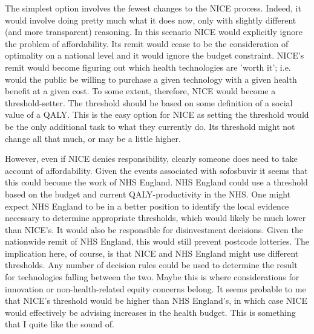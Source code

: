 The simplest option involves the fewest changes to the NICE process. Indeed, it would involve doing pretty much what it does now, only with slightly different (and more transparent) reasoning. In this scenario NICE would explicitly ignore the problem of affordability. Its remit would cease to be the consideration of optimality on a national level and it would ignore the budget constraint. NICE's remit would become figuring out which health technologies are 'worth it'; i.e. would the public be willing to purchase a given technology with a given health benefit at a given cost. To some extent, therefore, NICE would become a threshold-setter. The threshold should be based on some definition of a social value of a QALY. This is the easy option for NICE as setting the threshold would be the only additional task to what they currently do. Its threshold might not change all that much\cite{Donaldson_2011}, or may be a little higher\cite{Bobinac_2012}.

However, even if NICE denies responsibility, clearly someone does need to take account of affordability. Given the events associated with sofosbuvir it seems that this could become the work of NHS England. NHS England could use a threshold based on the budget and current QALY-productivity in the NHS. One might expect NHS England to be in a better position to identify the local evidence necessary to determine appropriate thresholds\cite{Appleby_2009}, which would likely be much lower than NICE's\cite{claxton2013methods}. It would also be responsible for disinvestment decisions. Given the nationwide remit of NHS England, this would still prevent postcode lotteries. The implication here, of course, is that NICE and NHS England might use different thresholds. Any number of decision rules could be used to determine the result for technologies falling between the two. Maybe this is where considerations for innovation or non-health-related equity concerns belong. It seems probable to me that NICE's threshold would be higher than NHS England's, in which case NICE would effectively be advising increases in the health budget. This is something that I quite like the sound of.